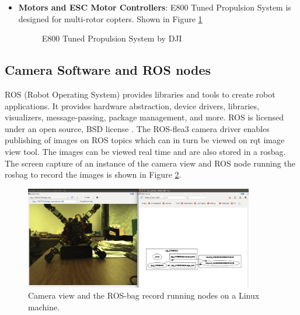\documentclass[12pt]{report}
\begin{document}
\begin{itemize}
\item \textbf{Motors and ESC Motor Controllers}: E800 Tuned Propulsion System is designed for multi-rotor copters. Shown in Figure \ref{fig:dji_propulsion_system}

\begin{figure}[H]
\centering
	\caption{E800 Tuned Propulsion System by DJI}
   \label{fig:dji_propulsion_system}
\end{figure}

\end{itemize}

\subsection{Camera Software and ROS nodes}
ROS (Robot Operating System) provides libraries and tools to create robot applications. It provides hardware abstraction, device drivers, libraries, visualizers, message-passing, package management, and more. ROS is licensed under an open source, BSD license \cite{ros}. The ROS-flea3 camera driver enables publishing of images on ROS topics which can in turn be viewed on rqt image view tool. The images can be viewed real time and are also stored in a rosbag. The screen capture of an instance of the camera view and ROS node running the rosbag to record the images is shown in Figure \ref{fig:cam_rqt}.

\begin{figure}[htp]
	\centering 
    \includegraphics[width=10cm]{cam_rqt.png}
	\caption{Camera view and the ROS-bag record running nodes on a Linux machine.}
   \label{fig:cam_rqt}
\end{figure}
\end{document}
